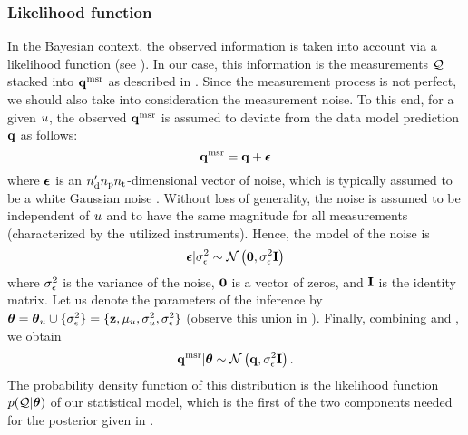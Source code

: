 \subsubsection{Likelihood function}
In the Bayesian context, the observed information is taken into account via a likelihood function (see ).
In our case, this information is the measurements $\mathcal{Q}$ stacked into $\mathbf{q}^{\text{msr}}$ as described in .
Since the measurement process is not perfect, we should also take into consideration the measurement noise.
To this end, for a given $u$, the observed $\mathbf{q}^{\text{msr}}$ is assumed to deviate from the data model prediction $\mathbf{q}$ as follows:
\begin{equation} \elabel{noisy-measurements}
  \vq^\meas = \vq + \vnoise
\end{equation}
where $\boldsymbol\epsilon$ is an ${n_\text{d}'} {n_\text{p}} {n_\text{t}}$-dimensional vector of noise, which is typically assumed to be a white Gaussian noise \cite{rasmussen2006, marzouk2009}.
Without loss of generality, the noise is assumed to be independent of $u$ and to have the same magnitude for all measurements (characterized by the utilized instruments).
Hence, the model of the noise is
\begin{equation} \elabel{noise-model}
  \vnoise | \sigma^2_\noise \sim \gaussian{\vZero}{\sigma^2_\noise \mOne}
\end{equation}
where $\sigma^2_\epsilon$ is the variance of the noise, $\mathbf{0}$ is a vector of zeros, and $\mathbf{I}$ is the identity matrix.
Let us denote the parameters of the inference by ${\boldsymbol\theta} = {\boldsymbol\theta}_u \cup \{ \sigma_\epsilon^2 \} = \{ \mathbf{z}, \mu_u, \sigma_u^2, \sigma_\epsilon^2 \}$ (observe this union in ).
Finally, combining  and , we obtain
\begin{equation} \elabel{likelihood}
  \vq^\meas | \vparam \sim \gaussian{\vq}{\sigma_\noise^2 \mOne}.
\end{equation}
The probability density function of this distribution is the likelihood function $\f{\QData | \vparam}$ of our statistical model, which is the first of the two components needed for the posterior given in .

